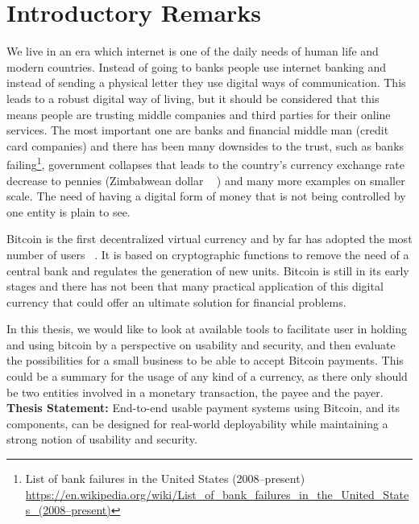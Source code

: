 
\setcounter{page}{1}

\chapter{Introductory Remarks}

We live in an era which internet is one of the daily needs of human life and modern countries. Instead of going to banks people use internet banking and instead of sending a physical letter they use digital ways of communication. This leads to a robust digital way of living, but it should be considered that this means people are trusting middle companies and third parties for their online services. The most important one are banks and financial middle man (\eg credit card companies) and there has been many downsides to the trust, such as banks failing\footnote{List of bank failures in the United States (2008–present) \url{https://en.wikipedia.org/wiki/List_of_bank_failures_in_the_United_States_(2008–present)}}, government collapses that leads to the country's currency exchange rate decrease to pennies (\eg Zimbabwean dollar ~\cite{hanke2009measurement} ) and many more examples on smaller scale. The need of having a digital form of money that is not being controlled by one entity is plain to see.

Bitcoin is the first decentralized virtual currency and by far has adopted the most number of users ~\cite{Nak08}. It is based on cryptographic functions to remove the need of a central bank and regulates the generation of new units. Bitcoin is still in its early stages and there has not been that many practical application of this digital currency that could offer an ultimate solution for financial problems.

In this thesis, we would like to look at available tools to facilitate user in holding and using bitcoin by a perspective on usability and security, and then evaluate the possibilities for a small business to be able to accept Bitcoin payments. This could be a summary for the usage of any kind of a currency, as there only should be two entities involved in a monetary transaction, the payee and the payer.\\

\textbf{Thesis Statement:} End-to-end usable payment systems using Bitcoin, and its components, can be designed for real-world deployability while maintaining a strong notion of usability and security.

